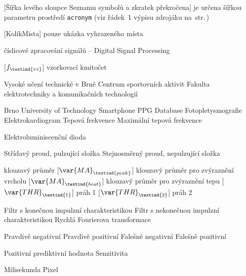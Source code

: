 \cleardoublepage
\chapter*{\listofabbrevname}
{}

\begin{acronym}[KolikMista]	%

		[Šířka levého sloupce Seznamu symbolů a zkratek překročena]
		{je určena šířkou parametru prostředí \texttt{acronym} (viz řádek~1 výpisu zdrojáku na~str.\,\pageref{lst:zkratky})}

		[KolikMista]
		{pouze ukázka vyhrazeného místa}

		{číslicové zpracování signálů -- Digital Signal Processing}

		[\ensuremath{f_\textind{vz}}]
		{vzorkovací kmitočet}

			{Vysoké učení technické v Brně}
			{Centrum sportovních aktivit}
			{Fakulta elektrotechniky a komunikačních technologií}

		{Brno University of Technology Smartphone PPG Database}
			{Fotopletysmografie}
			{Elektrokardiogram}
			{Tepová frekvence}
			{Maximální tepová frekvence}

			{Elektroluminiscenční dioda}

			{Střídavý proud, pulzující složka}
			{Stejnosměrný proud, nepulzující složka}

			{klouzavý průměr}
		[\ensuremath{\var{MA}_\textind{peak}}]
			{klouzavý průměr pro zvýraznění vrcholu}
		[\ensuremath{\var{MA}_\textind{beat}}]
		{klouzavý průměr pro zvýraznění tepu}
		[\ensuremath{\var{THR}_\textind{1}}]
		{práh 1}
		[\ensuremath{\var{THR}_\textind{2}}]
		{práh 2}
	
			{Filtr s konečnou impulzní charakteristikou}
			{Filtr s nekonečnou impulzní charakteristikou}
			{Rychlá Fourierova transformace}

			{Pravdivě negativní}	%
			{Pravdivě pozitivní}
			{Falešně negativní}
			{Falešně pozitivní}

			{Pozitivní prediktivní hodnota}
			{Senzitivita}

			{Milisekunda}	%
			{Pixel}			%


\end{acronym}
